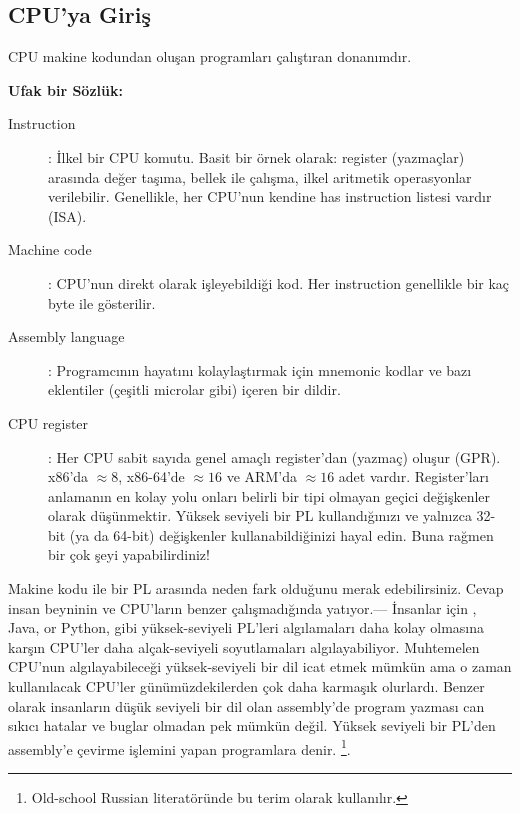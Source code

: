 \subsection{CPU'ya Giriş}

\ac{CPU} makine kodundan oluşan programları çalıştıran donanımdır. 

\textbf{Ufak bir Sözlük:}

\begin{description}
\item[Instruction]: İlkel bir \ac{CPU} komutu.
Basit bir örnek olarak: register (yazmaçlar) arasında değer taşıma, bellek ile çalışma, ilkel aritmetik operasyonlar verilebilir.
Genellikle, her \ac{CPU}'nun kendine has instruction listesi vardır (\ac{ISA}).

\item[Machine code]: \ac{CPU}'nun direkt olarak işleyebildiği kod.
Her instruction genellikle bir kaç byte ile gösterilir.
\item[Assembly language]: Programcının hayatını kolaylaştırmak için mnemonic kodlar ve bazı eklentiler (çeşitli microlar gibi) içeren bir dildir.
\item[CPU register]: Her \ac{CPU} sabit sayıda genel amaçlı register'dan (yazmaç) oluşur (\ac{GPR}).
x86'da $\approx 8$, x86-64'de $\approx 16$ ve ARM'da $\approx 16$ adet vardır.
Register'ları anlamanın en kolay yolu onları belirli bir tipi olmayan geçici değişkenler olarak düşünmektir.
Yüksek seviyeli bir \ac{PL} kullandığınızı ve yalnızca 32-bit (ya da 64-bit) değişkenler kullanabildiğinizi hayal edin.
Buna rağmen bir çok şeyi yapabilirdiniz!
\end{description}


Makine kodu ile bir \ac{PL} arasında neden fark olduğunu merak edebilirsiniz. Cevap insan beyninin ve \ac{CPU}'ların benzer çalışmadığında yatıyor.---%
İnsanlar için \CCpp, Java, or Python, gibi yüksek-seviyeli \ac{PL}'leri algılamaları daha kolay olmasına karşın \ac{CPU}'ler daha alçak-seviyeli soyutlamaları algılayabiliyor.
Muhtemelen \ac{CPU}'nun algılayabileceği yüksek-seviyeli bir dil icat etmek mümkün ama o zaman kullanılacak \ac{CPU}'ler günümüzdekilerden çok daha karmaşık olurlardı. 
Benzer olarak insanların düşük seviyeli bir dil olan assembly'de program yazması can sıkıcı hatalar ve buglar olmadan pek mümkün değil.
Yüksek seviyeli bir \ac{PL}'den assembly'e çevirme işlemini yapan programlara   denir.
\footnote{Old-school Russian literatöründe bu terim  olarak kullanılır.}.


